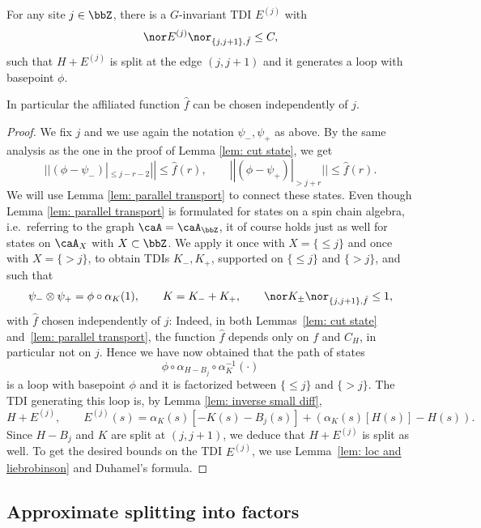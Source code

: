 \begin{lemma}\label{lem: splitting single edge}
	For any site $j \in \bbZ$, there is a $G$-invariant TDI $E^{(j)}$ with 
	$$
	\nor E^{(j)} \nor_{\{j,j+1\},\hat{f}} \leq  C,
	$$
	such that $ H+E^{(j)}$  is split at the edge $(j,j+1)$ and it generates a loop with basepoint $\phi$.
\end{lemma}
In particular the affiliated function $\hat{f}$ can be chosen independently of $j$.
\begin{proof}
	We fix $j$ and we use again the notation $\psi_-,\psi_+$ as above. 
	By the same analysis as the one in the proof of Lemma \ref{lem: cut state}, we get
	$$
	||(\phi-\psi_-)|_{\leq j-r-2} || \leq \hat{f}(r), \qquad ||(\phi-\psi_+)|_{> j+r} ||\leq \hat{f}(r).
	$$
	We will use Lemma \ref{lem: parallel transport} to connect these states. Even though Lemma \ref{lem: parallel transport} is formulated for states on a spin chain algebra, i.e.\ referring to the graph $\caA=\caA_\bbZ$, it of course holds just as well for states on $\caA_X$ with $X\subset\bbZ$. We apply it once with $X=\{\leq j\}$ and once with $X=\{> j\}$, to obtain TDIs $K_-,K_+$,  supported on $\{\leq j\}$ and  $\{> j\}$, and such that 
	$$
	\psi_-\otimes\psi_+  = \phi \circ \alpha_K(1), \qquad K=K_-+K_+, \qquad \nor K_{\pm}\nor_{\{j,j+1\},\hat{f}} \leq 1,
	$$ 
	with $\hat{f}$ chosen independently of $j$: Indeed, in both Lemmas~\ref{lem: cut state} and~\ref{lem: parallel transport}, the function $\hat f$ depends only on $f$ and $C_H$, in particular not on $j$. Hence we have now obtained that the path of states
	$$
	\phi\circ \alpha_{H-B_j} \circ \alpha_K^{-1}(\cdot)
	$$ is a loop with basepoint $\phi$ and it is factorized between $\{\leq j\}$ and $\{>j\}$. 
	The TDI generating this loop is, by Lemma \ref{lem: inverse small diff},
	$$
	H+E^{(j)}, \qquad E^{(j)}(s)= \alpha_K(s)[- K(s) - B_j(s)] + ( \alpha_{K}(s)[H(s)] - H(s)).
	$$
	Since $H-B_j$ and $K$ are split at $(j,j+1)$, we deduce that $H+E^{(j)}$ is split as well. 
	To get the desired bounds on the TDI $E^{(j)}$, we use Lemma~\ref{lem: loc and liebrobinson} and Duhamel's formula.
\end{proof}



\subsection{Approximate splitting into factors}\label{sec: approximate splitting}



